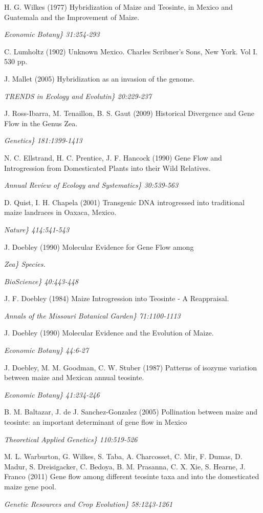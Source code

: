 \documentclass[11pt]{article}
\begin{document}
\begin{thebibliography}{1}
 H. G. Wilkes (1977) 
Hybridization of Maize and Teosinte, in Mexico and Guatemala and the Improvement of Maize. 
{\em Economic Botany\} 31:254-293

 C. Lumholtz (1902)
Unknown Mexico. Charles Scribner's Sons, New York. Vol I. 530 pp.

 J. Mallet (2005)
Hybridization as an invasion of the genome.
{\em TRENDS in Ecology and Evolutin\} 20:229-237

 J. Ross-Ibarra, M. Tenaillon, B. S. Gaut (2009)
Historical Divergence and Gene Flow in the Genus Zea.
{\em Genetics\} 181:1399-1413

 N. C. Ellstrand, H. C. Prentice, J. F. Hancock (1990)
Gene Flow and Introgression from Domesticated Plants into their Wild Relatives.
{\em Annual Review of Ecology and Systematics\} 30:539-563

 D. Quist, I. H. Chapela (2001)
Transgenic DNA introgressed into traditional maize landraces in Oaxaca, Mexico.
{\em Nature\} 414:541-543

 J. Doebley (1990)
Molecular Evidence for Gene Flow among {\em Zea\} Species.
{\em BioScience\} 40:443-448

 J. F. Doebley (1984)
Maize Introgression into Teosinte - A Reappraisal.
{\em Annals of the Missouri Botanical Garden\} 71:1100-1113

 J. Doebley (1990)
Molecular Evidence and the Evolution of Maize.
{\em Economic Botany\} 44:6-27

 J. Doebley, M. M. Goodman, C. W. Stuber (1987)
Patterns of isozyme variation between maize and Mexican annual teosinte.
{\em Economic Botany\} 41:234-246

 B. M. Baltazar, J. de J. Sanchez-Gonzalez (2005)
Pollination between maize and teosinte: an important determinant of gene flow in Mexico
{\em Theoretical Applied Genetics\} 110:519-526

 M. L. Warburton, G. Wilkes, S. Taba, A. Charcosset, C. Mir, F. Dumas, D. Madur, S. Dreisigacker, C. Bedoya, B. M. Prasanna, C. X. Xie, S. Hearne, J. Franco (2011)
Gene flow among different teosinte taxa and into the domesticated maize gene pool.
{\em Genetic Resources and Crop Evolution\} 58:1243-1261

}}}}}}}}}}}}
\end{thebibliography}
\end{document}
